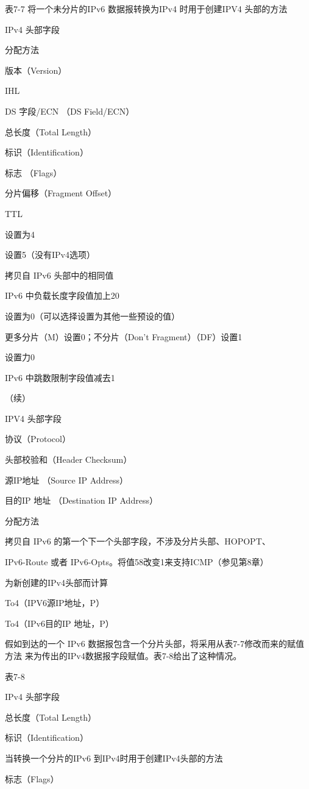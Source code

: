 表7-7 将一个未分片的IPv6 数据报转换为IPv4 时用于创建IPV4 头部的方法

IPv4 头部字段

分配方法

版本（Version）

IHL

DS 字段/ECN （DS Field/ECN）

总长度（Total Length）

标识（Identification）

标志 （Flags）

分片偏移（Fragment Offset）

TTL

设置为4

设置5（没有IPv4选项）

拷贝自 IPv6 头部中的相同值

IPv6 中负载长度字段值加上20

设置为0（可以选择设置为其他一些预设的值）

更多分片（M）设置0；不分片（Don't Fragment）（DF）设置1

设置力0

IPv6 中跳数限制字段值减去1

（续）

IPV4 头部字段

协议（Protocol）

头部校验和（Header Checksum）

源IP地址 （Source IP Address）

目的IP 地址 （Destination IP Address）

分配方法

拷贝自 IPv6 的第一个下一个头部字段，不涉及分片头部、HOPOPT、

IPv6-Route 或者 IPv6-Opts。将值58改变1来支持ICMP（参见第8章）

为新创建的IPv4头部而计算

To4（IPV6源IP地址，P）

To4（IPv6目的IP 地址，P）

假如到达的一个 IPv6 数据报包含一个分片头部，将采用从表7-7修改而来的赋值方法
来为传出的IPv4数据报字段赋值。表7-8给出了这种情况。

表7-8

IPv4 头部字段

总长度（Total Length）

标识（Identification）

当转换一个分片的IPv6 到IPv4时用于创建IPv4头部的方法

标志（Flags）

